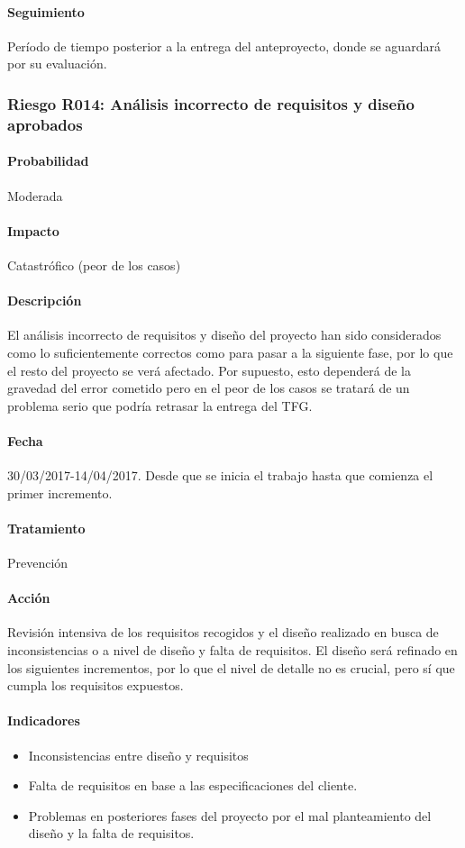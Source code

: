 \documentclass[10pt,a4paper]{article}
\begin{document}
				\paragraph{Seguimiento}	Período de tiempo posterior a la entrega del anteproyecto, donde se aguardará por su evaluación.
				
			\subsubsection{Riesgo R014: Análisis incorrecto de requisitos y diseño aprobados}
				\paragraph{Probabilidad} Moderada
				\paragraph{Impacto}	Catastrófico (peor de los casos)
				\paragraph{Descripción} El análisis incorrecto de requisitos y diseño del proyecto han sido considerados como lo suficientemente correctos como para pasar a la siguiente fase, por lo que el resto del proyecto se verá afectado. Por supuesto, esto dependerá de la gravedad del error cometido pero en el peor de los casos se tratará de un problema serio que podría retrasar la entrega del TFG.
				\paragraph{Fecha} 30/03/2017-14/04/2017. Desde que se inicia el trabajo hasta que comienza el primer incremento.
				\paragraph{Tratamiento} Prevención
				\paragraph{Acción} Revisión intensiva de los requisitos recogidos y el diseño realizado en busca de inconsistencias o a nivel de diseño y falta de requisitos. El diseño será refinado en los siguientes incrementos, por lo que el nivel de detalle no es crucial, pero sí que cumpla los requisitos expuestos.
				\paragraph{Indicadores} 
				    \begin{itemize}
				        \item Inconsistencias entre diseño y requisitos
				        \item Falta de requisitos en base a las especificaciones del cliente.
				        \item Problemas en posteriores fases del proyecto por el mal planteamiento del diseño y la falta de requisitos.
				    \end{itemize}
\end{document}
